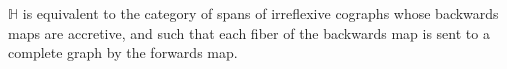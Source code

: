 \begin{proposition}
$\mathbb{H}$ is equivalent to the category of spans of irreflexive cographs whose backwards maps are accretive, and such that each fiber of the backwards map is sent to a complete graph by the forwards map.
\end{proposition}


